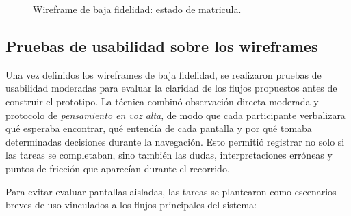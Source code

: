 \begin{figure}[H]
\centering
{}
\caption{Wireframe de baja fidelidad: estado de matricula.}
\label{fig:wf-matricula}
\end{figure}

\subsection{Pruebas de usabilidad sobre los wireframes}

Una vez definidos los wireframes de baja fidelidad, se realizaron pruebas de usabilidad moderadas para evaluar la claridad de los flujos propuestos antes de construir el prototipo. La técnica combinó observación directa moderada y protocolo de \textit{pensamiento en voz alta}, de modo que cada participante verbalizara qué esperaba encontrar, qué entendía de cada pantalla y por qué tomaba determinadas decisiones durante la navegación. Esto permitió registrar no solo si las tareas se completaban, sino también las dudas, interpretaciones erróneas y puntos de fricción que aparecían durante el recorrido.

Para evitar evaluar pantallas aisladas, las tareas se plantearon como escenarios breves de uso vinculados a los flujos principales del sistema:


